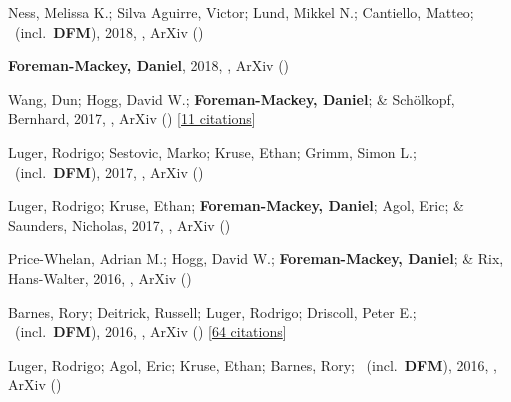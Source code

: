 \item[{\color{numcolor}\scriptsize22}] Ness, Melissa K.; Silva Aguirre, Victor; Lund, Mikkel N.; Cantiello, Matteo; \etal\ (incl.\ \textbf{DFM}), 2018, , ArXiv ()

\item[{\color{numcolor}\scriptsize21}] \textbf{Foreman-Mackey, Daniel}, 2018, , ArXiv ()

\item[{\color{numcolor}\scriptsize20}] Wang, Dun; Hogg, David W.; \textbf{Foreman-Mackey, Daniel}; \& Sch{\"o}lkopf, Bernhard, 2017, , ArXiv () [\href{https://ui.adsabs.harvard.edu/abs/2017arXiv171002428W}{11 citations}]

\item[{\color{numcolor}\scriptsize19}] Luger, Rodrigo; Sestovic, Marko; Kruse, Ethan; Grimm, Simon L.; \etal\ (incl.\ \textbf{DFM}), 2017, , ArXiv ()

\item[{\color{numcolor}\scriptsize18}] Luger, Rodrigo; Kruse, Ethan; \textbf{Foreman-Mackey, Daniel}; Agol, Eric; \& Saunders, Nicholas, 2017, , ArXiv ()

\item[{\color{numcolor}\scriptsize17}] Price-Whelan, Adrian M.; Hogg, David W.; \textbf{Foreman-Mackey, Daniel}; \& Rix, Hans-Walter, 2016, , ArXiv ()

\item[{\color{numcolor}\scriptsize16}] Barnes, Rory; Deitrick, Russell; Luger, Rodrigo; Driscoll, Peter E.; \etal\ (incl.\ \textbf{DFM}), 2016, , ArXiv () [\href{https://ui.adsabs.harvard.edu/abs/2016arXiv160806919B}{64 citations}]

\item[{\color{numcolor}\scriptsize15}] Luger, Rodrigo; Agol, Eric; Kruse, Ethan; Barnes, Rory; \etal\ (incl.\ \textbf{DFM}), 2016, , ArXiv ()

